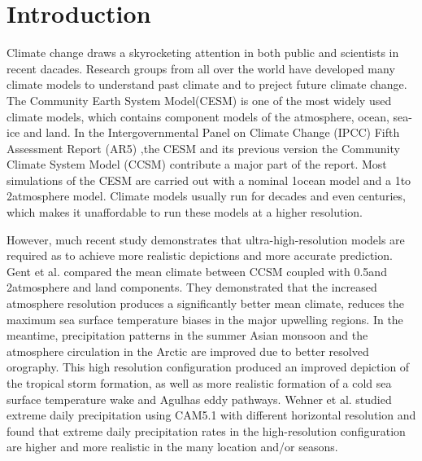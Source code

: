 \documentclass{sig-alternate}
\begin{document}



\section{Introduction} \label{se:int}

Climate change draws a skyrocketing attention in both public and scientists in recent dacades. 
Research groups from all over the world have developed many climate models to understand past climate and to preject future climate change. 
The Community Earth System Model(CESM) is one of the most widely used climate models, which contains component models of the atmosphere, ocean, sea-ice and land. 
In the Intergovernmental Panel on Climate Change (IPCC) Fifth Assessment Report (AR5) \cite{stocker2013climate},the CESM and its previous version the Community Climate System Model (CCSM) contribute a major part of the report. 
Most simulations of the CESM are carried out with a nominal 1\degree ocean model and a 1\degree to 2\degree atmosphere model. 
Climate models usually run for decades and even centuries, which makes it unaffordable to run these models at a higher resolution.

However, much recent study demonstrates that ultra-high-resolution models are required as to achieve more realistic depictions and more accurate prediction. 
Gent et al. \cite{gent2010improvements} compared the mean climate between CCSM coupled with 0.5\degree and 2\degree atmosphere and land components. 
They demonstrated that the increased atmosphere resolution produces a significantly better mean climate, reduces the maximum sea surface temperature biases in the major upwelling regions. 
In the meantime, precipitation patterns in the summer Asian monsoon and the atmosphere circulation in the Arctic are improved due to better resolved orography. 
This high resolution configuration produced an improved depiction of the tropical storm formation, as well as more realistic formation of a cold sea surface temperature wake and Agulhas eddy pathways. 
Wehner et al. \cite{wehner2014effect} studied extreme daily precipitation using CAM5.1 with different horizontal resolution and found that extreme daily precipitation rates in the high-resolution configuration are higher and more realistic in the many location and/or seasons. 
\end{document}

